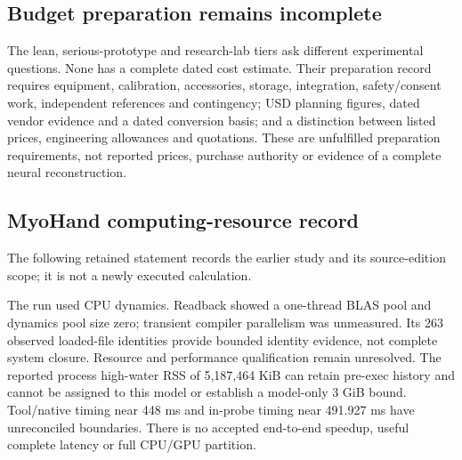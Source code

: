 \subsection{Budget preparation remains incomplete}
The lean, serious-prototype and research-lab tiers ask different experimental questions. None has a complete dated cost estimate. Their preparation record requires equipment, calibration, accessories, storage, integration, safety/consent work, independent references and contingency; USD planning figures, dated vendor evidence and a dated conversion basis; and a distinction between listed prices, engineering allowances and quotations. These are unfulfilled preparation requirements, not reported prices, purchase authority or evidence of a complete neural reconstruction.

\subsection{MyoHand computing-resource record}
The following retained statement records the earlier study and its source-edition scope; it is not a newly executed calculation.

The run used CPU dynamics. Readback showed a one-thread BLAS pool and dynamics pool size zero; transient compiler parallelism was unmeasured. Its 263 observed loaded-file identities provide bounded identity evidence, not complete system closure. Resource and performance qualification remain unresolved. The reported process high-water RSS of 5,187,464 KiB can retain pre-exec history and cannot be assigned to this model or establish a model-only 3 GiB bound. Tool/native timing near 448 ms and in-probe timing near 491.927 ms have unreconciled boundaries. There is no accepted end-to-end speedup, useful complete latency or full CPU/GPU partition.
